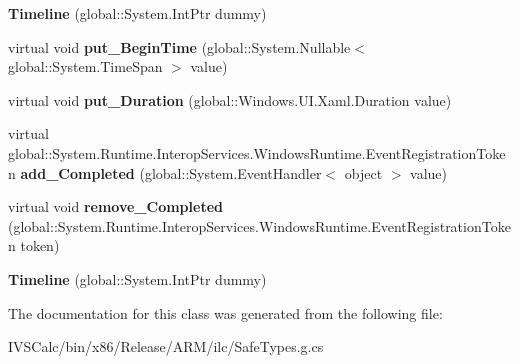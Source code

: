 \begin{DoxyCompactItemize}
\item 
\mbox{\label{class_windows_1_1_u_i_1_1_xaml_1_1_media_1_1_animation_1_1_timeline_ad9fb777f9fbd5b9e59022ab3cbcde141}} 
{\bfseries Timeline} (global\+::\+System.\+Int\+Ptr dummy)
\item 
\mbox{\label{class_windows_1_1_u_i_1_1_xaml_1_1_media_1_1_animation_1_1_timeline_aae3a485326665861681d7ef24e8bed71}} 
virtual void {\bfseries put\+\_\+\+Begin\+Time} (global\+::\+System.\+Nullable$<$ global\+::\+System.\+Time\+Span $>$ value)
\item 
\mbox{\label{class_windows_1_1_u_i_1_1_xaml_1_1_media_1_1_animation_1_1_timeline_ad18ba23ca70f9feb87ff33751276ed17}} 
virtual void {\bfseries put\+\_\+\+Duration} (global\+::\+Windows.\+U\+I.\+Xaml.\+Duration value)
\item 
\mbox{\label{class_windows_1_1_u_i_1_1_xaml_1_1_media_1_1_animation_1_1_timeline_a06df3c15f47b53c7bde83e2c99016be0}} 
virtual global\+::\+System.\+Runtime.\+Interop\+Services.\+Windows\+Runtime.\+Event\+Registration\+Token {\bfseries add\+\_\+\+Completed} (global\+::\+System.\+Event\+Handler$<$ object $>$ value)
\item 
\mbox{\label{class_windows_1_1_u_i_1_1_xaml_1_1_media_1_1_animation_1_1_timeline_abd69089a61fd390f3e7496347cf7afbd}} 
virtual void {\bfseries remove\+\_\+\+Completed} (global\+::\+System.\+Runtime.\+Interop\+Services.\+Windows\+Runtime.\+Event\+Registration\+Token token)
\item 
\mbox{\label{class_windows_1_1_u_i_1_1_xaml_1_1_media_1_1_animation_1_1_timeline_ad9fb777f9fbd5b9e59022ab3cbcde141}} 
{\bfseries Timeline} (global\+::\+System.\+Int\+Ptr dummy)
\end{DoxyCompactItemize}


The documentation for this class was generated from the following file\+:\begin{DoxyCompactItemize}
\item 
I\+V\+S\+Calc/bin/x86/\+Release/\+A\+R\+M/ilc/Safe\+Types.\+g.\+cs\end{DoxyCompactItemize}

